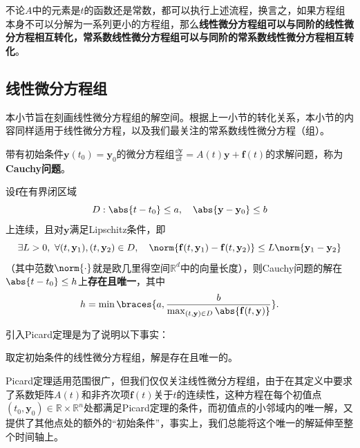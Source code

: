 不论$A$中的元素是$t$的函数还是常数，都可以执行上述流程，换言之，如果方程组本身不可以分解为一系列更小的方程组，那么\textbf{线性微分方程组可以与同阶的线性微分方程相互转化，常系数线性微分方程组可以与同阶的常系数线性微分方程相互转化}。

\subsection{线性微分方程组}\label{sub:solution_of_linear_equation_system}

本小节旨在刻画线性微分方程组的解空间。根据上一小节的转化关系，本小节的内容同样适用于线性微分方程，以及我们最关注的常系数线性微分方程（组）。

\begin{definition}[Cauchy问题]
    带有初始条件$\mathbf{y}(t_0)=\mathbf{y}_0$的微分方程组$\displaystyle\frac{\dd\mathbf{y}}{\dd t}=A(t)\mathbf{y}+\mathbf{f}(t)$的求解问题，称为\textbf{Cauchy问题}。
\end{definition}

\begin{claim}[Picard定理]
    设$\mathbf{f}$在有界闭区域
    \begin{equation}
        D:\abs{t-t_0}\leq a,\quad \abs{\mathbf{y}-\mathbf{y}_0}\leq b
    \end{equation}
    上连续，且对$\mathbf{y}$满足Lipschitz条件，即
    \begin{equation}
        \exists L>0,\ \forall (t,\mathbf{y}_1),(t,\mathbf{y}_2)\in D,\quad \norm{\mathbf{f}(t,\mathbf{y}_1)-\mathbf{f}(t,\mathbf{y}_2)}\leq L\norm{\mathbf{y}_1-\mathbf{y}_2}
    \end{equation}
    （其中范数$\norm{\cdot}$就是欧几里得空间$\mathbb{R}^d$中的向量长度），则Cauchy问题的解在$\abs{t-t_0}\leq h$上\textbf{存在且唯一}，其中
    \begin{equation}
        h=\min\braces{a,\frac{b}{\max_{(t,\mathbf{y})\in D}\abs{\mathbf{f}(t,\mathbf{y})}}}.
    \end{equation}
\end{claim}

引入Picard定理是为了说明以下事实：
\begin{proposition}
    取定初始条件的线性微分方程组，解是存在且唯一的。
\end{proposition}

Picard定理适用范围很广，但我们仅仅关注线性微分方程组，由于在其定义中要求了系数矩阵$A(t)$和非齐次项$\mathbf{f}(t)$关于$t$的连续性，这种方程在每个初值点$(t_0,\mathbf{y}_0)\in\mathbb{R} \times \mathbb{R}^n$处都满足Picard定理的条件，而初值点的小邻域内的唯一解，又提供了其他点处的额外的“初始条件”，事实上，我们总能将这个唯一的解延伸至整个时间轴上。


